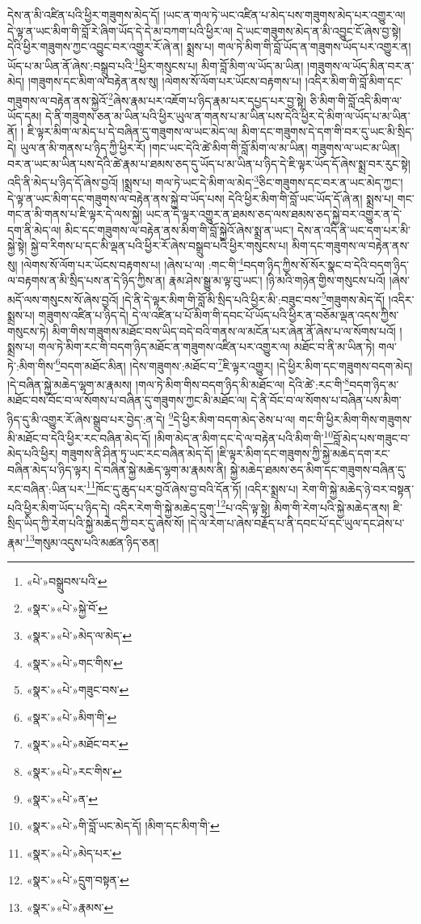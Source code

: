 དེས་ན་མི་འཛིན་པའི་ཕྱིར་གཟུགས་མེད་དོ། །ཡང་ན་གལ་ཏེ་ཡང་འཛིན་པ་མེད་པས་གཟུགས་མེད་པར་འགྱུར་ལ། དེ་ལྟ་ན་ཡང་མིག་གི་བློ་རེ་ཞིག་ཡོད་དེ་དེ་མ་བཀག་པའི་ཕྱིར་ལ། དེ་ཡང་གཟུགས་མེད་ན་མི་འབྱུང་ངོ་ཞེས་བྱ་སྟེ། དེའི་ཕྱིར་གཟུགས་ཀྱང་འབྱུང་བར་འགྱུར་རོ་ཞེ་ན། སྨྲས་པ། གལ་ཏེ་མིག་གི་བློ་ཡོད་ན་གཟུགས་ཡོད་པར་འགྱུར་ན། ཡོད་པ་མ་ཡིན་ནོ་ཞེས་:བསྒྲུབ་པའི་\footnote{«པེ་»བསྒྲུབས་པའི་}ཕྱིར་གསུངས་པ། མིག་བློ་མིག་ལ་ཡོད་མ་ཡིན། །གཟུགས་ལ་ཡོད་མིན་བར་ན་མེད། །གཟུགས་དང་མིག་ལ་བརྟེན་ནས་སུ། །ལེགས་སོ་ལོག་པར་ཡོངས་བརྟགས་པ། །འདིར་མིག་གི་བློ་མིག་དང་གཟུགས་ལ་བརྟེན་ནས་སྐྱེའོ་\footnote{«སྣར་»«པེ་»སྐྱེ་བོ་}ཞེས་རྣམ་པར་འཇོག་པ་ཉིད་རྣམ་པར་དཔྱད་པར་བྱ་སྟེ། ཅི་མིག་གི་བློ་འདི་མིག་ལ་ཡོད་དམ། དེ་ནི་གཟུགས་ཅན་མ་ཡིན་པའི་ཕྱིར་ཡུལ་ན་གནས་པ་མ་ཡིན་པས་དེའི་ཕྱིར་དེ་མིག་ལ་ཡོད་པ་མ་ཡིན་ནོ། །
ཇི་ལྟར་མིག་ལ་མེད་པ་དེ་བཞིན་དུ་གཟུགས་ལ་ཡང་མེད་ལ། མིག་དང་གཟུགས་དེ་དག་གི་བར་དུ་ཡང་མི་སྲིད་དེ། ཡུལ་ན་མི་གནས་པ་ཉིད་ཀྱི་ཕྱིར་རོ། །གང་ཡང་དེའི་ཚེ་མིག་གི་བློ་མིག་ལ་མ་ཡིན། གཟུགས་ལ་ཡང་མ་ཡིན། བར་ན་ཡང་མ་ཡིན་པས་དེའི་ཚེ་རྣམ་པ་ཐམས་ཅད་དུ་ཡོད་པ་མ་ཡིན་པ་ཉིད་དེ་ཇི་ལྟར་ཡོད་དོ་ཞེས་སྨྲ་བར་རུང་སྟེ། འདི་ནི་མེད་པ་ཉིད་དོ་ཞེས་བྱའོ། །སྨྲས་པ། གལ་ཏེ་ཡང་དེ་མིག་ལ་མེད་\footnote{«སྣར་»«པེ་»མེད་ལ་མེད་}ཅིང་གཟུགས་དང་བར་ན་ཡང་མེད་ཀྱང་། དེ་ལྟ་ན་ཡང་མིག་དང་གཟུགས་ལ་བརྟེན་ནས་སྐྱེ་བ་ཡོད་པས། དེའི་ཕྱིར་མིག་གི་བློ་ཡང་ཡོད་དོ་ཞེ་ན། སྨྲས་པ། གང་གང་ན་མི་གནས་པ་ཇི་ལྟར་དེ་ལས་སྐྱེ། ཡང་ན་དེ་ལྟར་འགྱུར་ན་ཐམས་ཅད་ལས་ཐམས་ཅད་སྐྱེ་བར་འགྱུར་ན་དེ་དག་ནི་མེད་ལ། མིང་དང་གཟུགས་ལ་བརྟེན་ནས་མིག་གི་བློ་སྐྱེའོ་ཞེས་སྨྲ་ན་ཡང་། དེས་ན་འདི་ནི་ཡང་དག་པར་མི་སྐྱེ་སྟེ། སྐྱེ་བ་རིགས་པ་དང་མི་ལྡན་པའི་ཕྱིར་རོ་ཞེས་བསྒྲུབ་པའི་ཕྱིར་གསུངས་པ། མིག་དང་གཟུགས་ལ་བརྟེན་ནས་སུ། །ལེགས་སོ་ལོག་པར་ཡོངས་བརྟགས་པ། །ཞེས་པ་ལ། :གང་གི་\footnote{«སྣར་»«པེ་»གང་གིས་}བདག་ཉིད་ཀྱིས་སོ་སོར་སྣང་བ་དེའི་བདག་ཉིད་ལ་བརྟགས་ན་མི་སྲིད་པས་ན་དེ་ཉིད་ཀྱིས་ན། རྣམ་ཤེས་སྒྱུ་མ་ལྟ་བུ་ཡང་། །ཉི་མའི་གཉེན་གྱིས་གསུངས་པའོ། །ཞེས་མདོ་ལས་གསུངས་སོ་ཞེས་བྱའོ། །དེ་ནི་དེ་ལྟར་མིག་གི་བློ་མི་སྲིད་པའི་ཕྱིར་མི་:བཟུང་བས་\footnote{«སྣར་»«པེ་»གཟུང་བས་}གཟུགས་མེད་དོ། །འདིར་སྨྲས་པ། གཟུགས་འཛིན་པ་ཉིད་དེ། དེ་ལ་འཛིན་པ་པོ་མིག་གི་དབང་པོ་ཡོད་པའི་ཕྱིར་ན་བཅོམ་ལྡན་འདས་ཀྱིས་གསུངས་ཏེ། མིག་གིས་གཟུགས་མཐོང་བས་ཡིད་བདེ་བའི་གནས་ལ་མངོན་པར་ཞེན་ནོ་ཞེས་པ་ལ་སོགས་པའོ། །སྨྲས་པ། གལ་ཏེ་མིག་རང་གི་བདག་ཉིད་མཐོང་ན་གཟུགས་འཛིན་པར་འགྱུར་ལ། མཐོང་བ་ནི་མ་ཡིན་ཏེ། གལ་ཏེ་:མིག་གིས་\footnote{«སྣར་»«པེ་»མིག་གི་}བདག་མཐོང་མིན། །དེས་གཟུགས་:མཐོང་བ་\footnote{«སྣར་»«པེ་»མཐོང་བར་}ཇི་ལྟར་འགྱུར། །དེ་ཕྱིར་མིག་དང་གཟུགས་བདག་མེད། །དེ་བཞིན་སྐྱེ་མཆེད་ལྷག་མ་རྣམས། །གལ་ཏེ་མིག་གིས་བདག་ཉིད་མི་མཐོང་ལ། དེའི་ཚེ་:རང་གི་\footnote{«སྣར་»«པེ་»རང་གིས་}བདག་ཉིད་མ་མཐོང་བས་བོང་བ་ལ་སོགས་པ་བཞིན་དུ་གཟུགས་ཀྱང་མི་མཐོང་ལ། དེ་ནི་བོང་བ་ལ་སོགས་པ་བཞིན་པས་མིག་ཉིད་དུ་མི་འགྱུར་རོ་ཞེས་སྒྲུབ་པར་བྱེད་:ན་དེ། \footnote{«སྣར་»«པེ་»ན་}དེ་ཕྱིར་མིག་བདག་མེད་ཅེས་པ་ལ། གང་གི་ཕྱིར་མིག་གིས་གཟུགས་མི་མཐོང་བ་དེའི་ཕྱིར་རང་བཞིན་མེད་དོ། །མིག་མེད་ན་མིག་དང་དེ་ལ་བརྟེན་པའི་མིག་གི་\footnote{«སྣར་»«པེ་»གི་བློ་ཡང་མེད་དོ། །མིག་དང་མིག་གི་}བློ་མེད་པས་གཟུང་བ་མེད་པའི་ཕྱིར། གཟུགས་ནི་ཤིན་ཏུ་ཡང་རང་བཞིན་མེད་དོ། །ཇི་ལྟར་མིག་དང་གཟུགས་ཀྱི་སྐྱེ་མཆེད་དག་རང་བཞིན་མེད་པ་ཉིད་ལྟར། དེ་བཞིན་སྐྱེ་མཆེད་ལྷག་མ་རྣམས་ནི། སྐྱེ་མཆེད་ཐམས་ཅད་མིག་དང་གཟུགས་བཞིན་དུ་རང་བཞིན་:ཡིན་པར་\footnote{«སྣར་»«པེ་»མེད་པར་}ཁོང་དུ་ཆུད་པར་བྱའོ་ཞེས་བྱ་བའི་དོན་ཏོ། །འདིར་སྨྲས་པ། རེག་གི་སྐྱེ་མཆེད་ཉེ་བར་བསྟན་པའི་ཕྱིར་མིག་ཡོད་པ་ཉིད་དེ། འདིར་རེག་གི་སྐྱེ་མཆེད་དྲུག་\footnote{«སྣར་»«པེ་»དྲུག་བསྟན་}པ་འདི་ལྟ་སྟེ། མིག་གི་རེག་པའི་སྐྱེ་མཆེད་ནས། ཇི་སྲིད་ཡིད་ཀྱི་རེག་པའི་སྐྱེ་མཆེད་ཀྱི་བར་དུ་ཞེས་སོ། །དེ་ལ་རེག་པ་ཞེས་བརྗོད་པ་ནི་དབང་པོ་དང་ཡུལ་དང་ཤེས་པ་རྣམ་\footnote{«སྣར་»«པེ་»རྣམས་}གསུམ་འདུས་པའི་མཚན་ཉིད་ཅན། 